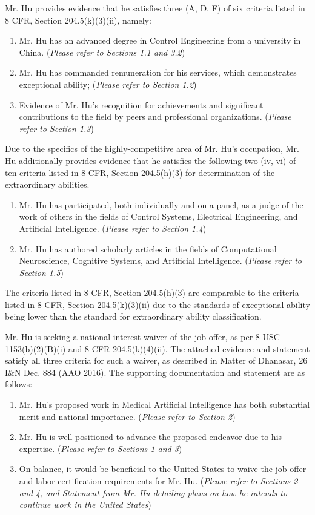 \documentclass{article}
\begin{document}
Mr. Hu provides evidence that he satisfies three (A, D, F) of six criteria listed in 8 CFR, Section 204.5(k)(3)(ii), namely:
\begin{enumerate}
    \item Mr. Hu has an advanced degree in Control Engineering from a university in China. ({\it Please refer to Sections 1.1 and 3.2})
    \item Mr. Hu has commanded remuneration for his services, which demonstrates exceptional ability; ({\it Please refer to Section 1.2})
    \item Evidence of Mr. Hu's recognition for achievements and significant contributions to the field by peers and professional organizations. ({\it Please refer to Section 1.3})
\end{enumerate}
Due to the specifics of the highly-competitive area of Mr. Hu's occupation, Mr. Hu additionally provides evidence that he satisfies the following two (iv, vi) of ten criteria listed in 8 CFR, Section 204.5(h)(3) for determination of the extraordinary abilities. 
\begin{enumerate}
    \item Mr. Hu has participated, both individually and on a panel, as a judge of the work of others in the fields of Control Systems, Electrical Engineering, and Artificial Intelligence. ({\it Please refer to Section 1.4})
    \item Mr. Hu has authored scholarly articles in the fields of Computational Neuroscience, Cognitive Systems, and Artificial Intelligence. ({\it Please refer to Section 1.5})
\end{enumerate}

The criteria listed in 8 CFR, Section 204.5(h)(3) are comparable to the criteria listed in 8 CFR, Section 204.5(k)(3)(ii) due to the standards of exceptional ability being lower than the standard for extraordinary ability classification.

Mr. Hu is seeking a national interest waiver of the job offer, as per 8 USC 1153(b)(2)(B)(i) and 8 CFR  204.5(k)(4)(ii). The attached evidence and statement satisfy all three criteria for such a waiver, as described in Matter of Dhanasar, 26 I\&N Dec. 884 (AAO 2016). The supporting documentation and statement are as follows:

\begin{enumerate}
    \item Mr. Hu's proposed work in Medical Artificial Intelligence has both substantial merit and national importance. ({\it Please refer to Section 2})
    \item Mr. Hu is well-positioned to advance the proposed endeavor due to his expertise. ({\it Please refer to Sections 1 and 3})
    \item On balance, it would be beneficial to the United States to waive the job offer and labor certification requirements for Mr. Hu. ({\it Please refer to Sections 2 and 4, and Statement from Mr. Hu detailing plans on how he intends to continue work in the United States})
\end{enumerate}
\end{document}

